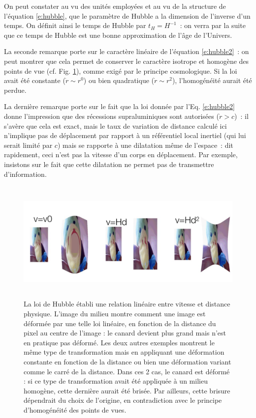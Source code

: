 On peut constater au vu des unités employées et au vu de la structure de l'équation \ref{e:hubble}, que le paramètre de Hubble a la dimension de l'inverse d'un temps. On définit ainsi le temps de Hubble par $t_H=H^{-1}$~: on verra par la suite que ce temps de Hubble est une bonne approximation de l'âge de l'Univers. 

La seconde remarque porte sur le caractère linéaire de l'équation \ref{e:hubble2}~: on peut montrer que cela permet de conserver le caractère isotrope et homogène des points de vue (cf. Fig. \ref{f:canard}), comme exigé par le principe cosmologique. Si la loi avait été constante ($\dot r \sim r^0$) ou bien quadratique ($\dot r\sim r^2$), l'homogénéité aurait été perdue. 

La dernière remarque porte sur le fait que la loi donnée par l'Eq. \ref{e:hubble2} donne l'impression que des récessions supraluminiques sont autorisées ($\dot r>c$)~: il s'avère que cela est exact, mais le taux de variation de distance calculé ici n'implique pas de déplacement par rapport à un référentiel local inertiel (qui lui serait limité par $c$) mais se rapporte à une dilatation  même de l'espace~: dit rapidement, ceci n'est pas la vitesse d'un corps en déplacement. Par exemple, insistons sur le fait que cette dilatation ne permet pas de transmettre d'information.

\begin{figure}[htbp]
	\centering
		\includegraphics[height=6cm]{figs/canard.png}
	\caption[loi de Hubble et homogénéité]{La loi de Hubble établi une relation linéaire entre vitesse et distance physique. L'image du milieu montre comment une image est déformée par une telle loi linéaire, en fonction de la distance du pixel au centre de l'image : le canard devient plus grand mais n'est en pratique pas déformé. Les deux autres exemples montrent le même type de transformation mais en appliquant une déformation constante en fonction de la distance ou bien une déformation variant comme le carré de la distance. Dans ces 2 cas, le canard est déformé : si ce type de transformation avait été appliquée à un milieu homogène, cette dernière aurait été brisée. Par ailleurs, cette brisure dépendrait du choix de l'origine, en contradiction avec le principe d'homogénéité des points de vues.}
	\label{f:canard}
\end{figure}

